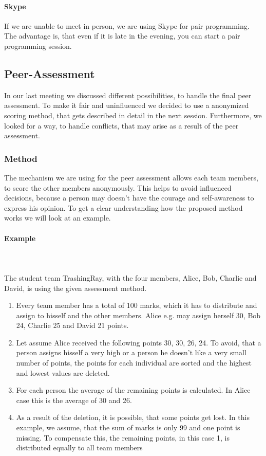 \paragraph{Skype}

If we are unable to meet in person, we are using Skype for pair programming. The advantage is, that even if it is late in the evening, you can start a pair programming session. 

\subsection{Peer-Assessment}

In our last meeting we discussed different possibilities, to handle the final peer assessment. To make it fair and uninfluenced we decided to use a anonymized scoring method, that gets described in detail in the next session. Furthermore, we looked for a way, to handle conflicts, that may arise as a result of the peer assessment. 

\subsubsection{Method}

The mechanism we are using for the peer assessment allows each team members, to score the other members anonymously. This helps to avoid influenced decisions, because a person may doesn't have the courage and self-awareness to express his opinion. To get a clear understanding how the proposed method works we will look at an example.

\paragraph{Example} \\\\

The student team TrashingRay, with the four members, Alice, Bob, Charlie and David, is using the given assessment method. 

\begin{enumerate}  
\item Every team member has a total of 100 marks, which it has to distribute and assign to hisself and the other members. Alice e.g. may assign herself 30, Bob 24, Charlie 25 and David 21 points. 
\item Let assume Alice received the following points 30, 30, 26, 24. To avoid, that a person assigns hisself a very high or a person he doesn't like a very small number of points, the points for each individual are sorted and the highest and lowest values are deleted. 
\item For each person the average of the remaining points is calculated. In Alice case this is the average of 30 and 26. 
\item As a result of the deletion, it is possible, that some points get \grqq{}lost\grqq{}. In this example, we assume, that the sum of marks is only 99 and one point is missing. To compensate this, the remaining points, in this case 1, is distributed equally to all team members 
\end{enumerate}

